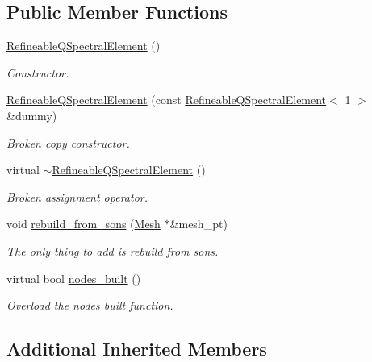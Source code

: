 \subsection*{Public Member Functions}
\begin{DoxyCompactItemize}
\item 
\hyperlink{classoomph_1_1RefineableQSpectralElement_3_011_01_4_a309518c58b6d071df3c12f6b5917b991}{Refineable\+Q\+Spectral\+Element} ()
\begin{DoxyCompactList}\small\item\em Constructor. \end{DoxyCompactList}\item 
\hyperlink{classoomph_1_1RefineableQSpectralElement_3_011_01_4_a1ba452016352f4f8e48d9adc12cb8906}{Refineable\+Q\+Spectral\+Element} (const \hyperlink{classoomph_1_1RefineableQSpectralElement}{Refineable\+Q\+Spectral\+Element}$<$ 1 $>$ \&dummy)
\begin{DoxyCompactList}\small\item\em Broken copy constructor. \end{DoxyCompactList}\item 
virtual \hyperlink{classoomph_1_1RefineableQSpectralElement_3_011_01_4_a17b34f92ef98e86cc94c7c6b610ddf8d}{$\sim$\+Refineable\+Q\+Spectral\+Element} ()
\begin{DoxyCompactList}\small\item\em Broken assignment operator. \end{DoxyCompactList}\item 
void \hyperlink{classoomph_1_1RefineableQSpectralElement_3_011_01_4_a7a5d6ced6c1c327f779e456303908c0e}{rebuild\+\_\+from\+\_\+sons} (\hyperlink{classoomph_1_1Mesh}{Mesh} $\ast$\&mesh\+\_\+pt)
\begin{DoxyCompactList}\small\item\em The only thing to add is rebuild from sons. \end{DoxyCompactList}\item 
virtual bool \hyperlink{classoomph_1_1RefineableQSpectralElement_3_011_01_4_ae80853a6ef35f51a36028619dde94c7a}{nodes\+\_\+built} ()
\begin{DoxyCompactList}\small\item\em Overload the nodes built function. \end{DoxyCompactList}\end{DoxyCompactItemize}
\subsection*{Additional Inherited Members}


